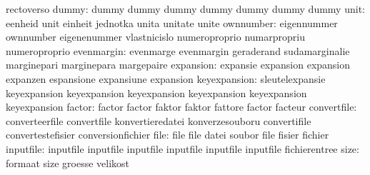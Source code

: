                            rectoverso
                    dummy: dummy                     dummy
                           dummy                     dummy
                           dummy                     dummy
                           dummy
                     unit: eenheid                   unit
                           einheit                   jednotka
                           unita                     unitate
                           unite
                ownnumber: eigennummer               ownnumber
                           eigenenummer              vlastnicislo
                           numeroproprio             numarpropriu
                           numeroproprio
               evenmargin: evenmarge                 evenmargin
                           geraderand                sudamarginalie
                           marginepari               marginepara
                           margepaire
                expansion: expansie                  expansion
                           expansion                 expanzen
                           espansione                expansiune
                           expansion
             keyexpansion: sleutelexpansie           keyexpansion
                           keyexpansion              keyexpansion
                           keyexpansion              keyexpansion
                           keyexpansion
                   factor: factor                    factor
                           faktor                    faktor
                           fattore                   factor
                           facteur
              convertfile: converteerfile            convertfile
                           konvertieredatei          konverzesouboru
                           convertifile              convertestefisier
                           conversionfichier
                     file: file                      file
                           datei                     soubor
                           file                      fisier
                           fichier
                inputfile: inputfile                 inputfile
                           inputfile                 inputfile
                           inputfile                 inputfile
                           fichierentree
                     size: formaat                   size
                           groesse                   velikost
